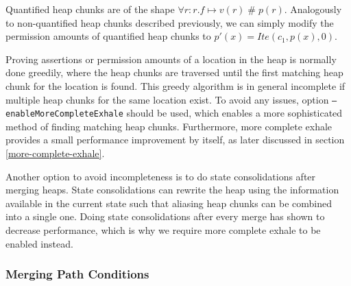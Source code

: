 \documentclass[11pt]{article}
\DeclareMathOperator{\perm}{\mathbin{\#}}
\begin{document}
    Quantified heap chunks are of the shape
    $\forall r: r.f \mapsto v(r) \perm p(r)$.
    Analogously to non-quantified heap chunks described previously,
    we can simply modify the permission amounts of
    quantified heap chunks to $p'(x) = Ite(c_1, p(x), 0)$.
    

    Proving assertions or permission amounts of a location in the heap
    is normally done greedily, where the heap chunks are
    traversed until the first matching heap chunk for the location is found.
    This greedy algorithm is in general incomplete if multiple heap chunks for the same location
    exist. To avoid any issues,
    option \texttt{--enableMoreCompleteExhale} should be used,
    which enables a more sophisticated method of finding matching heap chunks.
    Furthermore, more complete exhale provides a small performance improvement
    by itself, as later discussed in section \ref{more-complete-exhale}.

    Another option to avoid incompleteness is to do state consolidations
    after merging heaps. State consolidations can rewrite the heap using the information
    available in the current state such that aliasing heap chunks can be combined into a single one.
    Doing state consolidations after every merge has shown to decrease performance, which is why
    we require more complete exhale to be enabled instead.



    \subsubsection{Merging Path Conditions}
\end{document}
